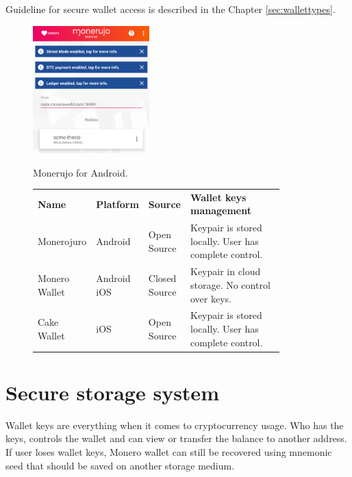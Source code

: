 \documentclass[
  printed, %
  table,   %
  lof,     %
  lot,     %
           oneside, color
]{fithesis3}
\begin{document}
Guideline for secure wallet access is described in the Chapter \ref{sec:wallettypes}. 

\begin{figure}[H]
\begin{center}
\vspace{-0.75em}
 \includegraphics[trim={0 1.8cm 0 0},clip,width=0.4\textwidth]{Screenshot_1542566492.png}
    \caption{Monerujo for Android.}
    \vspace{-1.5em}
    \label{pic:withoutresdrawable}
\end{center}
    \end{figure}
 \vspace{-0.9em}
\begin{figure}[H]
\centering\begin{tabular}{p{0.2\linewidth}p{0.15\linewidth}p{0.1\linewidth}p{0.4\linewidth}}
\textbf{Name}         & \textbf{Platform}      & \textbf{Source}        & \textbf{Wallet keys management} \\
Monerojuro    & Android       & Open Source   & Keypair is stored locally.  User has complete control.                      \\
Monero Wallet & Android  iOS & Closed Source & Keypair in cloud storage. No control over keys. \\
Cake Wallet   & iOS           & Open Source   & Keypair is stored locally.  User has complete control.                           
\end{tabular}
\label{table:monero-mobile}
\end{figure}


\section{Secure storage system}
Wallet keys are everything when it comes to cryptocurrency usage. Who has the keys, controls the wallet and can view or transfer the balance to another address. If user loses wallet keys, Monero wallet can still be recovered using mnemonic seed that should be saved on another storage medium. 
\end{document}
